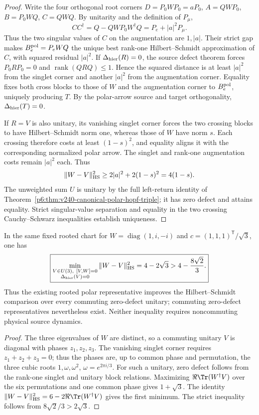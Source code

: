 \documentclass[12pt,a4paper]{article}
\begin{document}
\begin{proof}
Write the four orthogonal root corners
\(D=P_0WP_0=aP_0\), \(A=QWP_0\), \(B=P_0WQ\),
\(C=QWQ\).  By unitarity and the definition of \(P_\mu\),
\[
 CC^\dagger=Q-QWP_0W^\dagger Q
  =P_e+|a|^2P_\mu.
\]
Thus the two singular values of \(C\) on the augmentation are
\(1,|a|\).  Their strict gap makes
\(B_e^{\rm pol}=P_eWQ\) the unique best rank-one
Hilbert--Schmidt approximation of \(C\), with squared residual
\(|a|^2\).
If \(\Delta_{\rm hier}(R)=0\), the source defect theorem forces
\(P_0RP_0=0\) and \(\operatorname{rank}(QRQ)\le1\).
Hence the squared distance is at least \(|a|^2\) from the singlet
corner and another \(|a|^2\) from the augmentation corner.
Equality fixes both cross blocks to those of \(W\) and the
augmentation corner to \(B_e^{\rm pol}\), uniquely producing
\(T\).  By the polar-arrow source and target orthogonality,
\(\Delta_{\rm hier}(T)=0\).

If \(R=V\) is also unitary, its vanishing singlet corner forces
the two crossing blocks to have Hilbert--Schmidt norm one, whereas
those of \(W\) have norm \(s\).  Each crossing therefore costs
at least \((1-s)^2\), and equality aligns it with the corresponding
normalized polar arrow.  The singlet and rank-one augmentation costs
remain \(|a|^2\) each.  Thus
\[
 \|W-V\|_{\rm HS}^2\ge2|a|^2+2(1-s)^2=4(1-s).
\]
The unweighted sum \(U\) is unitary by the full left-return identity
of Theorem~\ref{p6:thm:v240-canonical-polar-hopf-triple}; it has
zero defect and attains equality.  Strict singular-value separation
and equality in the two crossing Cauchy--Schwarz inequalities establish
uniqueness.
\end{proof}

\begin{corollary}
\label{p6:cor:v3024-commuting-hopf-control}
In the same fixed rooted chart for
\(W=\operatorname{diag}(1,i,-i)\) and
\(c=(1,1,1)^\mathsf T/\sqrt3\), one has
\[
 \boxed{\min_{\substack{V\in U(3),\ [V,W]=0\\
                   \Delta_{\rm hier}(V)=0}}
     \|W-V\|_{\rm HS}^2=4-2\sqrt3
     >4-\frac{8\sqrt2}{3}.}
\]
Thus the existing rooted polar representative improves the
Hilbert--Schmidt comparison over every commuting zero-defect unitary;
commuting zero-defect representatives nevertheless exist.
Neither inequality requires noncommuting physical source dynamics.
\end{corollary}
\begin{proof}
The three eigenvalues of \(W\) are distinct, so a commuting unitary
\(V\) is diagonal with phases \(z_1,z_2,z_3\).
The vanishing singlet corner requires
\(z_1+z_2+z_3=0\); thus the phases are, up to common phase and
permutation, the three cubic roots
\(1,\omega,\omega^2\), \(\omega=e^{2\pi i/3}\).
For such a unitary, zero defect follows from the rank-one singlet
and unitary block relations.  Maximizing
\(\Re\Tr(W^\dagger V)\) over the six permutations and one common
phase gives \(1+\sqrt3\).  The identity
\(\|W-V\|_{\rm HS}^2=6-2\Re\Tr(W^\dagger V)\)
gives the first minimum.  The strict inequality follows from
\(8\sqrt2/3>2\sqrt3\).
\end{proof}
\end{document}
